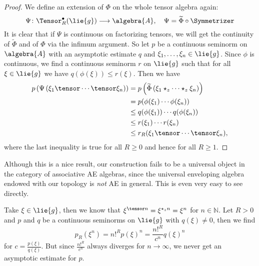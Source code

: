 \begin{proof}
    We define an extension of $\Phi$ on the whole tensor algebra
    again:
    \begin{equation*}
        \Psi \colon
        \Tensor_R^{\bullet}(\lie{g})
        \longrightarrow
        \algebra{A},
        \quad
        \Psi
        =
        \widetilde{\Phi} \circ \Symmetrizer
    \end{equation*}
    It is clear that if $\Psi$ is continuous on factorizing tensors,
    we will get the continuity of $\widetilde{\Phi}$ and of $\Phi$ via the
    infimum argument. So let $p$ be a continuous seminorm on
    $\algebra{A}$ with an asymptotic estimate $q$ and $\xi_1, \ldots,
    \xi_n \in \lie{g}$. Since $\phi$ is continuous, we find a
    continuous seminorm $r$ on $\lie{g}$ such that for all $\xi \in
    \lie{g}$ we have $q(\phi(\xi)) \leq r(\xi)$. Then we have
    \begin{align*}
        p \left(
        \Psi \left(
        \xi_1 \tensor \cdots \tensor \xi_n
        \right) \right)
        & =
        p \left(
        \widetilde{\Phi} \left(
        \xi_1 \star_z \cdots \star_z \xi_n
        \right) \right)
        \\
        & =
        p( \phi(\xi_1) \cdots \phi(\xi_n) )
        \\
        & \leq
        q( \phi(\xi_1) )
        \cdots
        q( \phi(\xi_n) )
        \\
        & \leq
        r(\xi_1) \cdots r(\xi_n)
        \\
        & \leq
        r_R(\xi_1 \tensor \cdots \tensor \xi_n),
    \end{align*}
    where the last inequality is true for all $R \geq 0$ and hence for all 
    $R \geq 1$.
\end{proof}
Although this is a nice result, our construction fails to be a universal object 
in the category of associative AE algebras, since the universal enveloping 
algebra endowed with our topology is \emph{not} AE in general. This is even 
very easy to see directly.
\begin{example}
    Take $\xi \in \lie{g}$, then we know that $\xi^{\tensor n} =
    \xi^{\ostar_z n} = \xi^n$ for $n \in \mathbb{N}$. 
    Let $R > 0$ and $p$ and $q$ be a continuous seminorms on $\lie{g}$ with 
    $q(\xi) \neq 0$, then we find
    \begin{equation}
        p_R(\xi^n)
        =
        n!^R p(\xi)^n
        =
        \frac{n!^R}{c^n} q(\xi)^n
    \end{equation}
    for $c = \frac{p(\xi)}{q(\xi)}$. But since $\frac{n!^R}{c^n}$ always
    diverges for $n \longrightarrow \infty$, we never get an asymptotic
    estimate for $p$.
\end{example}
